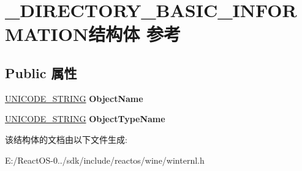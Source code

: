 \hypertarget{struct___d_i_r_e_c_t_o_r_y___b_a_s_i_c___i_n_f_o_r_m_a_t_i_o_n}{}\section{\+\_\+\+D\+I\+R\+E\+C\+T\+O\+R\+Y\+\_\+\+B\+A\+S\+I\+C\+\_\+\+I\+N\+F\+O\+R\+M\+A\+T\+I\+O\+N结构体 参考}
\label{struct___d_i_r_e_c_t_o_r_y___b_a_s_i_c___i_n_f_o_r_m_a_t_i_o_n}
\subsection*{Public 属性}
\begin{DoxyCompactItemize}
\item 
\mbox{\label{struct___d_i_r_e_c_t_o_r_y___b_a_s_i_c___i_n_f_o_r_m_a_t_i_o_n_a443d45395ddad0d066795200a947a7cb}} 
\hyperlink{struct___u_n_i_c_o_d_e___s_t_r_i_n_g}{U\+N\+I\+C\+O\+D\+E\+\_\+\+S\+T\+R\+I\+NG} {\bfseries Object\+Name}
\item 
\mbox{\label{struct___d_i_r_e_c_t_o_r_y___b_a_s_i_c___i_n_f_o_r_m_a_t_i_o_n_a0aa5fb672c6f823d653052ad39cb7dfe}} 
\hyperlink{struct___u_n_i_c_o_d_e___s_t_r_i_n_g}{U\+N\+I\+C\+O\+D\+E\+\_\+\+S\+T\+R\+I\+NG} {\bfseries Object\+Type\+Name}
\end{DoxyCompactItemize}


该结构体的文档由以下文件生成\+:\begin{DoxyCompactItemize}
\item 
E\+:/\+React\+O\+S-\/0../sdk/include/reactos/wine/winternl.\+h\end{DoxyCompactItemize}
